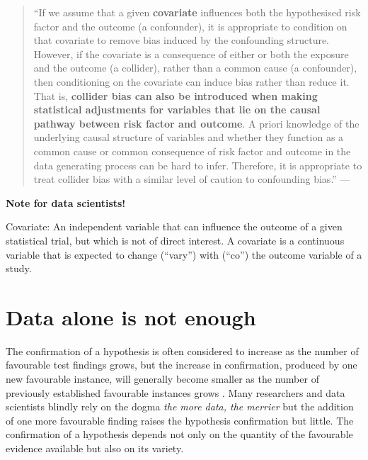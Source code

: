 \documentclass[
  12pt,
]{book}
\begin{document}
\begin{quote}
``If we assume that a given \textbf{covariate} influences both the hypothesised risk factor and the outcome (a confounder), it is appropriate to condition on that covariate to remove bias induced by the confounding structure. However, if the covariate is a consequence of either or both the exposure and the outcome (a collider), rather than a common cause (a confounder), then conditioning on the covariate can induce bias rather than reduce it. That is, \textbf{collider bias can also be introduced when making statistical adjustments for variables that lie on the causal pathway between risk factor and outcome}. A priori knowledge of the underlying causal structure of variables and whether they function as a common cause or common consequence of risk factor and outcome in the data generating process can be hard to infer. Therefore, it is appropriate to treat collider bias with a similar level of caution to confounding bias.'' --- \citep{griffith2020collider}
\end{quote}

\begin{tipbox}

\textbf{Note for data scientists!}

Covariate: An independent variable that can influence the outcome of a given statistical trial, but which is not of direct interest. A covariate is a continuous variable that is expected to change (``vary'') with (``co'') the outcome variable of a study.

\end{tipbox}

\section{Data alone is not enough}\label{data-is-not-enough}

The confirmation of a hypothesis is often considered to increase as the number of favourable test findings grows, but the increase in confirmation, produced by one new favourable instance, will generally become smaller as the number of previously established favourable instances grows \citep{hempel-pos}. Many researchers and data scientists blindly rely on the dogma \emph{the more data, the merrier} but the addition of one more favourable finding raises the hypothesis confirmation but little. The confirmation of a hypothesis depends not only on the quantity of the favourable evidence available but also on its variety.
\end{document}
